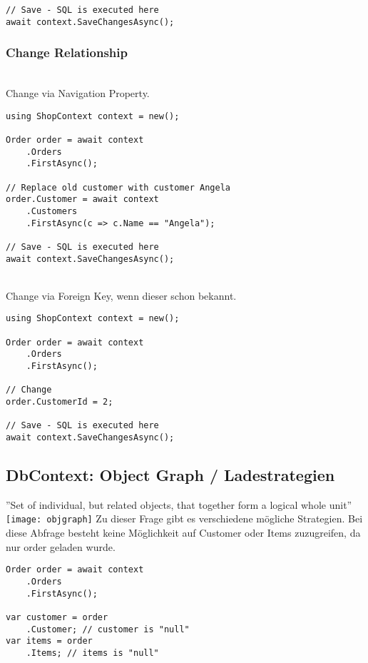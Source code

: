 \begin{multicols*}{2}
\begin{lstlisting}
// Save - SQL is executed here
await context.SaveChangesAsync();
\end{lstlisting}

\subsubsection{Change Relationship}
\\
Change via Navigation Property.
\begin{lstlisting}
using ShopContext context = new();

Order order = await context
    .Orders
    .FirstAsync();

// Replace old customer with customer Angela
order.Customer = await context
    .Customers
    .FirstAsync(c => c.Name == "Angela");

// Save - SQL is executed here
await context.SaveChangesAsync();
\end{lstlisting}
\\
Change via Foreign Key, wenn dieser schon bekannt.
\begin{lstlisting}
using ShopContext context = new();

Order order = await context
    .Orders
    .FirstAsync();

// Change
order.CustomerId = 2;
    
// Save - SQL is executed here
await context.SaveChangesAsync();
\end{lstlisting}

\subsection{DbContext: Object Graph / Ladestrategien}
 ''Set of individual, but related objects, that together form a logical whole unit''
\texttt{[image: objgraph]}
 Zu dieser Frage gibt es
verschiedene mögliche Strategien.
Bei diese Abfrage besteht keine Möglichkeit auf Customer oder Items zuzugreifen, da nur order geladen wurde.
\begin{lstlisting}
Order order = await context 
    .Orders
    .FirstAsync();

var customer = order
    .Customer; // customer is "null"
var items = order
    .Items; // items is "null"
\end{lstlisting}

\end{multicols*}
